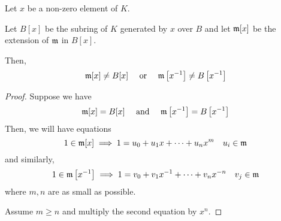 \begin{lemma}{}{}
\label{lemma:5.20}
	Let \(x\) be a non-zero element of \(K\).

	Let \(B[x]\) be the subring of \(K\)
	generated by \(x\) over \(B\) and let \(\mathfrak{m}[x]\) be the
	extension of \(\mathfrak{m}\) in \(B[x]\).

	Then,
	\[
		\mathfrak{m}[x] \neq B[x] \quad \text{ or } \quad
		\mathfrak{m}\left[ x^{-1} \right] \neq B\left[ x^{-1} \right]
	\]
\end{lemma}
\begin{proof}
	Suppose we have
	\[
		\mathfrak{m}[x] = B[x] \quad \text{ and } \quad \mathfrak{m}\left[ x^{-1} \right] = B\left[ x^{-1} \right]
	\]
	Then, we will have equations
	\[
		1 \in \mathfrak{m}[x] \implies 1 = u_0 + u_1 x + \cdots + u_n x^m
		\quad u_i \in \mathfrak{m}
	\]
	and similarly,
	\[
		1 \in \mathfrak{m}\left[ x^{-1} \right]
		\implies 1 = v_0 + v_1 x^{-1} + \cdots + v_n x^{-n}
		\quad v_j \in \mathfrak{m}
	\]
	where \(m, n\) are as small as possible.

	Assume \(m \geq n\) and multiply the second equation by \(x^n\).
\end{proof}